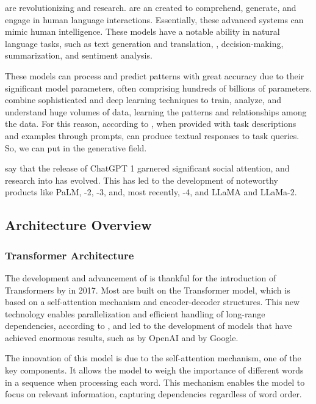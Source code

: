 {\llm} are revolutionizing {\nlp} and {\ai} research. {\llm} are an {\ai} created to comprehend, generate, and engage in human language interactions. Essentially, these advanced {\ai} systems can mimic human intelligence. These models have a notable ability in natural language tasks, such as text generation and translation, {\qa}, decision-making, summarization, and sentiment analysis.

These models can process and predict patterns with great accuracy due to their significant model parameters, often comprising hundreds of billions of parameters. \citet{hadi_LLM_2023} combine sophisticated {\slm} and deep learning techniques to train, analyze, and understand huge volumes of data, learning the patterns and relationships among the data. For this reason, according to \citet{naveed_comprehensive_2023}, when provided with task descriptions and examples through prompts, {\llm} can produce textual responses to task queries. So, we can put {\llm} in the generative {\ai} field.

\citet{liu_prompting_nodate} say that the release of ChatGPT 1 garnered significant social attention, and research into {\llm} has evolved. This has led to the development of noteworthy products like PaLM, {\gpt}-2, {\gpt}-3, and, most recently, {\gpt}-4, and LLaMA and LLaMa-2.


\subsection{Architecture Overview}

\subsubsection{Transformer Architecture}

The development and advancement of {\llm} is thankful for the introduction of Transformers by \citet{vaswani_attention_2023} in 2017. Most {\llm} are built on the Transformer model, which is based on a self-attention mechanism and encoder-decoder structures. This new technology enables parallelization and efficient handling of long-range dependencies, according to \citet{hadi_LLM_2023}, and led to the development of models that have achieved enormous results, such as {\gpt} by OpenAI and {\bert} by Google.

The innovation of this model is due to the self-attention mechanism, one of the key components. It allows the model to weigh the importance of different words in a sequence when processing each word. This mechanism enables the model to focus on relevant information, capturing dependencies regardless of word order.

